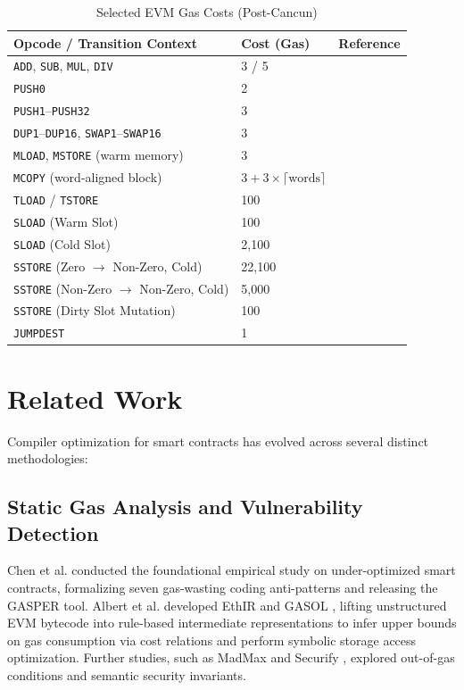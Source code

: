 \documentclass[conference]{IEEEtran}
\begin{document}
\begin{table}[htbp]
\caption{Selected EVM Gas Costs (Post-Cancun)}
\begin{center}
\begin{tabular}{llr}
\toprule
\textbf{Opcode / Transition Context} & \textbf{Cost (Gas)} & \textbf{Reference} \\
\midrule
\texttt{ADD}, \texttt{SUB}, \texttt{MUL}, \texttt{DIV} & 3 / 5 & \cite{wood2014ethereum} \\
\texttt{PUSH0} & 2 & \cite{eip3855} \\
\texttt{PUSH1}--\texttt{PUSH32} & 3 & \cite{wood2014ethereum} \\
\texttt{DUP1}--\texttt{DUP16}, \texttt{SWAP1}--\texttt{SWAP16} & 3 & \cite{wood2014ethereum} \\
\texttt{MLOAD}, \texttt{MSTORE} (warm memory) & 3 & \cite{wood2014ethereum} \\
\texttt{MCOPY} (word-aligned block) & $3 + 3 \times \lceil \text{words} \rceil$ & \cite{eip5656} \\
\texttt{TLOAD} / \texttt{TSTORE} & 100 & \cite{eip1153} \\
\texttt{SLOAD} (Warm Slot) & 100 & \cite{eip2929} \\
\texttt{SLOAD} (Cold Slot) & 2,100 & \cite{eip2929} \\
\texttt{SSTORE} (Zero $\to$ Non-Zero, Cold) & 22,100 & \cite{eip2929, eip3529} \\
\texttt{SSTORE} (Non-Zero $\to$ Non-Zero, Cold) & 5,000 & \cite{eip2929, eip3529} \\
\texttt{SSTORE} (Dirty Slot Mutation) & 100 & \cite{eip3529} \\
\texttt{JUMPDEST} & 1 & \cite{wood2014ethereum} \\
\bottomrule
\end{tabular}
\end{center}
\label{tab:costs}
\end{table}

\section{Related Work}
Compiler optimization for smart contracts has evolved across several distinct methodologies:

\subsection{Static Gas Analysis and Vulnerability Detection}
Chen et al. \cite{chen2017under} conducted the foundational empirical study on under-optimized smart contracts, formalizing seven gas-wasting coding anti-patterns and releasing the GASPER tool. Albert et al. developed EthIR \cite{albert2018ethir} and GASOL \cite{albert2020gasol}, lifting unstructured EVM bytecode into rule-based intermediate representations to infer upper bounds on gas consumption via cost relations and perform symbolic storage access optimization. Further studies, such as MadMax \cite{grech2018madmax} and Securify \cite{tsankov2018securify}, explored out-of-gas conditions and semantic security invariants.
\end{document}
